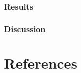 \documentclass[10pt,letterpaper]{article}
\begin{document}
\hypertarget{results-2}{%
\subsubsection{Results}\label{results-2}}

\hypertarget{discussion-2}{%
\subsubsection{Discussion}\label{discussion-2}}

\hypertarget{references}{%
\section*{References}\label{references}}

\nolinenumbers
\end{document}
